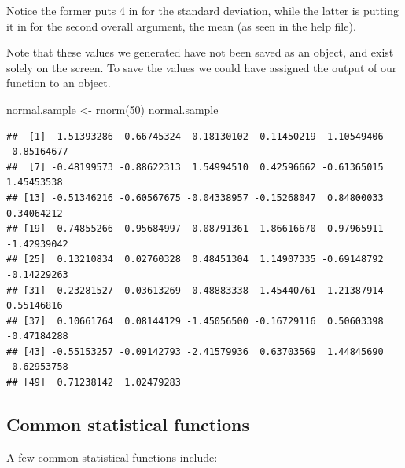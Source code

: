 \documentclass[
]{book}
\newenvironment{Shaded}{\begin{snugshade}}{\end{snugshade}}
\newcommand{\DecValTok}[1]{\textcolor[rgb]{0.00,0.00,0.81}{#1}}
\newcommand{\FunctionTok}[1]{\textcolor[rgb]{0.00,0.00,0.00}{#1}}
\newcommand{\NormalTok}[1]{#1}
\newcommand{\OtherTok}[1]{\textcolor[rgb]{0.56,0.35,0.01}{#1}}
\begin{document}
Notice the former puts 4 in for the standard deviation, while the latter is putting it in for the second overall argument, the mean (as seen in the help file).

Note that these values we generated have not been saved as an object, and exist solely on the screen. To save the values we could have assigned the output of our function to an object.

\begin{Shaded}
\begin{Highlighting}[]
\NormalTok{normal.sample }\OtherTok{\textless{}{-}} \FunctionTok{rnorm}\NormalTok{(}\DecValTok{50}\NormalTok{)}
\NormalTok{normal.sample}
\end{Highlighting}
\end{Shaded}

\begin{verbatim}
##  [1] -1.51393286 -0.66745324 -0.18130102 -0.11450219 -1.10549406 -0.85164677
##  [7] -0.48199573 -0.88622313  1.54994510  0.42596662 -0.61365015  1.45453538
## [13] -0.51346216 -0.60567675 -0.04338957 -0.15268047  0.84800033  0.34064212
## [19] -0.74855266  0.95684997  0.08791361 -1.86616670  0.97965911 -1.42939042
## [25]  0.13210834  0.02760328  0.48451304  1.14907335 -0.69148792 -0.14229263
## [31]  0.23281527 -0.03613269 -0.48883338 -1.45440761 -1.21387914  0.55146816
## [37]  0.10661764  0.08144129 -1.45056500 -0.16729116  0.50603398 -0.47184288
## [43] -0.55153257 -0.09142793 -2.41579936  0.63703569  1.44845690 -0.62953758
## [49]  0.71238142  1.02479283
\end{verbatim}

\hypertarget{common-statistical-functions}{%
\subsection*{Common statistical functions}\label{common-statistical-functions}}

A few common statistical functions include:
\end{document}
